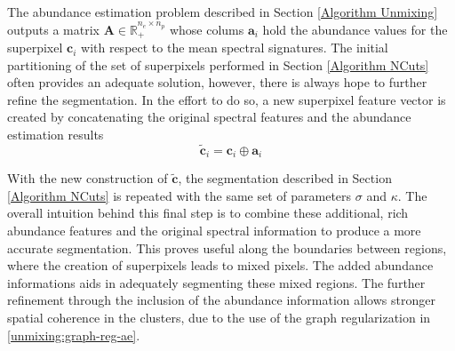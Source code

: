 The abundance estimation problem described in Section \ref{Algorithm Unmixing} outputs a matrix $ \mathbf{A} \in \mathbb{R}_+^{n_e \times n_p}$ whose colums $\mathbf{a}_i$ hold the abundance values for the superpixel $\mathbf{c}_i$ with respect to the mean spectral signatures. The initial partitioning of the set of superpixels performed in Section \ref{Algorithm NCuts} often provides an adequate solution, however, there is always hope to further refine the segmentation. In the effort to do so, a new superpixel feature vector is created by concatenating the original spectral features and the abundance estimation results
\begin{equation}
    \label{Feature Vector Creation}
    \tilde{\mathbf{c}}_i = \mathbf{c}_i \oplus \mathbf{a}_i
\end{equation}

With the new construction of $\tilde{\mathbf{c}}$, the segmentation described in Section \ref{Algorithm NCuts} is repeated with the same set of parameters $\sigma$ and $\kappa$. The overall intuition behind this final step is to combine these additional, rich abundance features and the original spectral information to produce a more accurate segmentation. This proves useful along the boundaries between regions, where the creation of superpixels leads to mixed pixels. The added abundance informations aids in adequately segmenting these mixed regions. The further refinement through the inclusion of the abundance information allows stronger spatial coherence in the clusters, due to the use of the graph regularization in \eqref{unmixing:graph-reg-ae}.

